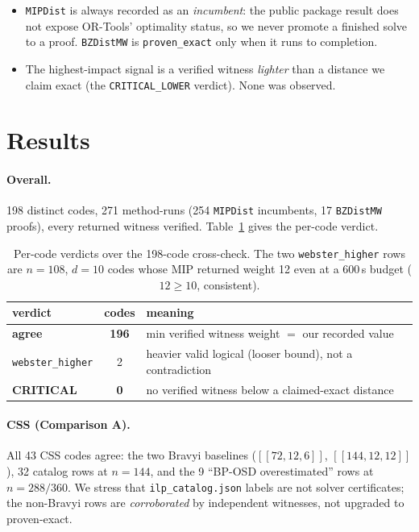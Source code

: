 \documentclass[11pt]{article}
\newcommand{\code}[1]{[\![#1]\!]}
\begin{document}
\begin{itemize}
  \item \texttt{MIPDist} is always recorded as an \emph{incumbent}: the public
  package result does not expose OR-Tools' optimality status, so we never promote
  a finished solve to a proof. \texttt{BZDistMW} is \texttt{proven\_exact} only
  when it runs to completion.
  \item The highest-impact signal is a verified witness \emph{lighter} than a
  distance we claim exact (the \texttt{CRITICAL\_LOWER} verdict). None was
  observed.
\end{itemize}

\section{Results}

\paragraph{Overall.} 198 distinct codes, 271 method-runs (254 \texttt{MIPDist}
incumbents, 17 \texttt{BZDistMW} proofs), every returned witness verified.
Table~\ref{tab:verdicts} gives the per-code verdict.

\begin{table}[h]
\centering
\begin{tabular}{lcl}
\toprule
verdict & codes & meaning \\
\midrule
\textbf{agree} & \textbf{196} & min verified witness weight $=$ our recorded value \\
\texttt{webster\_higher} & 2 & heavier valid logical (looser bound), not a contradiction \\
\textbf{CRITICAL} & \textbf{0} & no verified witness below a claimed-exact distance \\
\bottomrule
\end{tabular}
\caption{Per-code verdicts over the 198-code cross-check. The two
\texttt{webster\_higher} rows are $n{=}108$, $d{=}10$ codes whose MIP returned
weight 12 even at a 600\,s budget ($12 \ge 10$, consistent).}
\label{tab:verdicts}
\end{table}

\paragraph{CSS (Comparison A).} All 43 CSS codes agree: the two Bravyi baselines
($\code{72,12,6}$, $\code{144,12,12}$), 32 catalog rows at $n{=}144$, and the 9
``BP-OSD overestimated'' rows at $n{=}288/360$. We stress that
\texttt{ilp\_catalog.json} labels are not solver certificates; the non-Bravyi rows
are \emph{corroborated} by independent witnesses, not upgraded to proven-exact.
\end{document}
